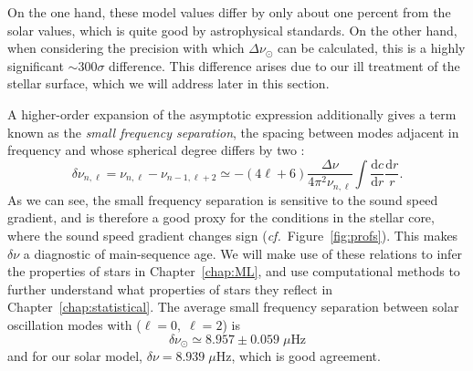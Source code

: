 On the one hand, these model values differ by only about one percent from the solar values, which is quite good by astrophysical standards. 
On the other hand, when considering the precision with which ${\Delta\nu_{\odot}}$ can be calculated, this is a highly significant ${\sim 300\sigma}$ difference. 
This difference arises due to our ill treatment of the stellar surface, which we will address later in this section. 

A higher-order expansion of the asymptotic expression additionally gives a term known as the \emph{small frequency separation}, the spacing between modes adjacent in frequency and whose spherical degree differs by two : 
\begin{equation} \label{eq:dnu}
    \delta\nu_{n,\ell}
    =
    \nu_{n,\ell}
    -
    \nu_{n-1,\ell+2}
    \simeq
    -(4\ell + 6)
    \frac{\Delta\nu}{4\pi^2 \nu_{n,\ell}}
    \int
        \frac{\text{d}c}{\text{d}r}
        \frac{\text{d}r}{r}.
\end{equation}
As we can see, the small frequency separation is sensitive to the sound speed gradient, and is therefore a good proxy for the conditions in the stellar core, where the sound speed gradient changes sign (\emph{cf.}~Figure~\ref{fig:profs}). 
This makes ${\delta\nu}$ a diagnostic of main-sequence age. 
We will make use of these relations to infer the properties of stars in Chapter~\ref{chap:ML}, and use computational methods to further understand what properties of stars they reflect in Chapter~\ref{chap:statistical}. 
The average small frequency separation between solar oscillation modes with (${\ell=0},\;{\ell=2}$) is
\begin{equation}
    \delta\nu_\odot \simeq 8.957 \pm 0.059\;\mu\text{Hz}
\end{equation}
and for our solar model, ${\delta\nu=8.939\;\mu\text{Hz}}$, which is good agreement. 



